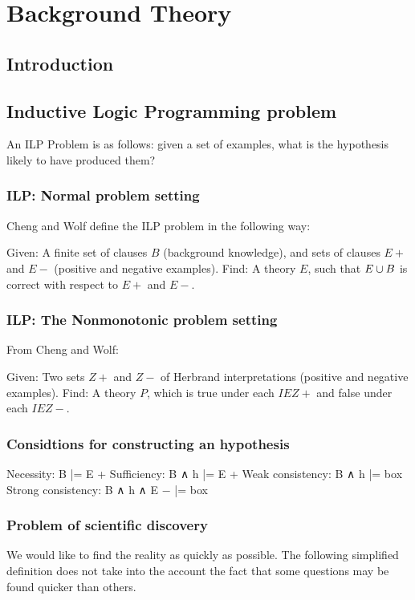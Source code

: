 
\chapter{Background Theory}

\label{ch:background}

\section{Introduction}

\section{Inductive Logic Programming problem}

An ILP Problem is as follows: given a set of examples, what is the hypothesis likely to have produced them?

\subsection{ILP: Normal problem setting}
Cheng and Wolf define the ILP problem in the following way:

Given: A finite set of clauses $B$ (background knowledge), and sets of clauses $E+$ and $E-$ (positive and negative examples).
Find: A theory $E$, such that $E \cup B$ is correct with respect to $E+$ and $E-$.

\subsection{ILP: The Nonmonotonic problem setting}
From Cheng and Wolf:

Given: Two sets $Z+$ and $Z-$ of Herbrand interpretations (positive and negative examples).
Find: A theory $P$, which is true under each $I E Z+$ and false
under each $I E Z-$.

\subsection{Considtions for constructing an hypothesis}
Necessity: B |= E +
Sufficiency: B ∧ h |= E +
Weak consistency: B ∧ h |= box
Strong consistency: B ∧ h ∧ E − |= box

\subsection{Problem of scientific discovery}
We would like to find the reality as quickly as possible. The following simplified definition does not take into the account the fact that some questions may be found quicker than others.


